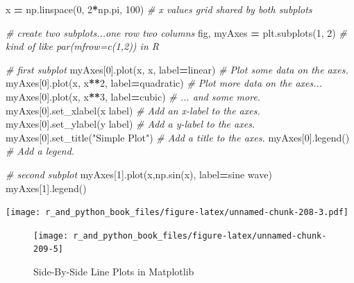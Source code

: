 \documentclass[
  12pt,
  krantz2]{krantz}
\makeatletter
\newenvironment{Shaded}{\begin{snugshade}}{\end{snugshade}}
\newcommand{\CommentTok}[1]{\textcolor[rgb]{0.37,0.37,0.37}{\textit{#1}}}
\newcommand{\DecValTok}[1]{\textcolor[rgb]{0.06,0.06,0.06}{#1}}
\newcommand{\NormalTok}[1]{#1}
\newcommand{\OperatorTok}[1]{\textcolor[rgb]{0.43,0.43,0.43}{\textbf{#1}}}
\newcommand{\StringTok}[1]{\textcolor[rgb]{0.5,0.5,0.5}{#1}}
\newenvironment{kframe}{%
\medskip{}
\setlength{\fboxsep}{.8em}
 \def\at@end@of@kframe{}%
 \ifinner\ifhmode%
  \def\at@end@of@kframe{\end{minipage}}%
  \begin{minipage}{\columnwidth}%
 \fi\fi%
 \def\FrameCommand##1{\hskip\@totalleftmargin \hskip-\fboxsep
 \colorbox{shadecolor}{##1}\hskip-\fboxsep
     \hskip-\linewidth \hskip-\@totalleftmargin \hskip\columnwidth}%
 \MakeFramed {\advance\hsize-\width
   \@totalleftmargin\z@ \linewidth\hsize
   \@setminipage}}%
 {\par\unskip\endMakeFramed%
 \at@end@of@kframe}
\renewenvironment{Shaded}{\begin{kframe}}{\end{kframe}}
\makeatother
\begin{document}
\begin{Shaded}
\begin{Highlighting}[]
\NormalTok{x }\OperatorTok{=}\NormalTok{ np.linspace(}\DecValTok{0}\NormalTok{, }\DecValTok{2}\OperatorTok{*}\NormalTok{np.pi, }\DecValTok{100}\NormalTok{) }\CommentTok{\# x values grid shared by both subplots}

\CommentTok{\# create two subplots...one row two columns}
\NormalTok{fig, myAxes }\OperatorTok{=}\NormalTok{ plt.subplots(}\DecValTok{1}\NormalTok{, }\DecValTok{2}\NormalTok{) }\CommentTok{\# kind of like par(mfrow=c(1,2)) in R}

\CommentTok{\# first subplot}
\NormalTok{myAxes[}\DecValTok{0}\NormalTok{].plot(x, x, label}\OperatorTok{=}\StringTok{\textquotesingle{}linear\textquotesingle{}}\NormalTok{)  }\CommentTok{\# Plot some data on the axes.}
\NormalTok{myAxes[}\DecValTok{0}\NormalTok{].plot(x, x}\OperatorTok{**}\DecValTok{2}\NormalTok{, label}\OperatorTok{=}\StringTok{\textquotesingle{}quadratic\textquotesingle{}}\NormalTok{)  }\CommentTok{\# Plot more data on the axes...}
\NormalTok{myAxes[}\DecValTok{0}\NormalTok{].plot(x, x}\OperatorTok{**}\DecValTok{3}\NormalTok{, label}\OperatorTok{=}\StringTok{\textquotesingle{}cubic\textquotesingle{}}\NormalTok{)  }\CommentTok{\# ... and some more.}
\NormalTok{myAxes[}\DecValTok{0}\NormalTok{].set\_xlabel(}\StringTok{\textquotesingle{}x label\textquotesingle{}}\NormalTok{)  }\CommentTok{\# Add an x{-}label to the axes.}
\NormalTok{myAxes[}\DecValTok{0}\NormalTok{].set\_ylabel(}\StringTok{\textquotesingle{}y label\textquotesingle{}}\NormalTok{)  }\CommentTok{\# Add a y{-}label to the axes.}
\NormalTok{myAxes[}\DecValTok{0}\NormalTok{].set\_title(}\StringTok{"Simple Plot"}\NormalTok{)  }\CommentTok{\# Add a title to the axes.}
\NormalTok{myAxes[}\DecValTok{0}\NormalTok{].legend()  }\CommentTok{\# Add a legend.}

\CommentTok{\# second subplot}
\NormalTok{myAxes[}\DecValTok{1}\NormalTok{].plot(x,np.sin(x), label}\OperatorTok{=}\StringTok{\textquotesingle{}sine wave\textquotesingle{}}\NormalTok{)}
\NormalTok{myAxes[}\DecValTok{1}\NormalTok{].legend()}
\end{Highlighting}
\end{Shaded}

\texttt{[image: r\_and\_python\_book\_files/figure-latex/unnamed-chunk-208-3.pdf]}

\begin{figure}
\texttt{[image: r\_and\_python\_book\_files/figure-latex/unnamed-chunk-209-5]} \caption{Side-By-Side Line Plots in Matplotlib}\label{fig:unnamed-chunk-209}
\end{figure}
\end{document}
